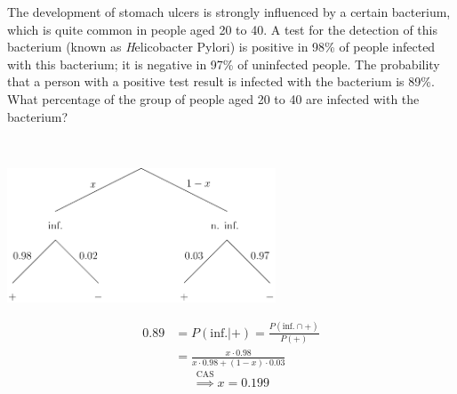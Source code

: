 \documentclass[twoside,11pt,a4paper]{article}
\newif\ifEN \ENtrue	                %
\def\tr|#1|#2|{\ifEN #2\else #1\fi}     %
\theoremstyle{definition}
\newcounter{exc}
\def\answerline#1{%
   \ifhmode\\[1ex]\fcolorbox{solbox}{solbox}{\hbox to \linewidth{\vbox to #1\baselineskip{}}}%
   \else\fcolorbox{solbox}{solbox}{\hbox to \linewidth{\vbox to #1\baselineskip{}}}%
   \fi
 }
\begin{document}
\begin{xxwrap}
  \begin{exc}

    \tr|Ob eine Person ein Magengeschwür entwickelt hängt stark von einem bestimmten Bakterium ab, das im Alter von 20 bis 40 recht häufig vorkommt. 
    Ein Test für dieses Bakterium (bekannt unter dem Namen  \emph{Helicobacter Pylor}) ist positiv bei 98\% aller Personen, die mit diesem Bakterium infiziert sind; der Test ist negativ bei 97\% der Personen, 
    die nicht infiziert sind. Die Wahrscheinlichkeit, dass eine Person mit positivem Test Resultat mit dem Bakterium infiziert ist 89\%. Welcher Anteil der 20 bis 40 jährigen ist mit dem Bakterium infiziert?
    |The development of stomach ulcers is strongly influenced by a certain bacterium, which is quite common in people aged 20 to 40. 
    A test for the detection of this bacterium (known as \emph{Helicobacter Pylori}) is positive in 98\% of people infected with this bacterium; it is negative in 97\% of uninfected people. 
    The probability that a person with a positive test result is infected with the bacterium is 89\%. What percentage of the group of people aged 20 to 40 are infected with the bacterium?|
  \end{exc}
  \begin{Answer}$\,$\\
    \begin{center}
    \includegraphics[width=8cm]{tree_bact_SOL_1.pdf}
  \end{center}
    \begin{align*}
      0.89&=P(\text{inf.}|+)=\frac{P(\text{inf.}\cap +)}{P(+)}\\
          &=\frac{x\cdot 0.98}{x\cdot 0.98+(1-x)\cdot 0.03}
    \end{align*}
    \[
      \overset{\text{CAS}}{\Rightarrow} x=0.199
    \]
  \end{Answer}
  \answerline{12}
\end{xxwrap}
\end{document}
